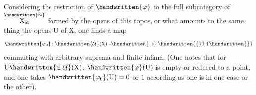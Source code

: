 \clearpage
{}

\newsavebox{\coteFourTypescript}
\begin{lrbox}{\coteFourTypescript}
\begin{minipage}[t]{.96\linewidth}
Considering the restriction of $\handwritten{\varphi}$ to the full subcategory of $\overset{\handwritten{\sim}}{\mathrm{X}_{\text{ét}}}$ formed by the opens of this topos, or what amounts to the same thing  the opens $\mathrm U$ of $\mathrm X$, one finds a map
\[
\handwritten{\varphi_{0}}:\handwritten{\mathcal U}(\mathrm X)\mathrel{\mbox{-}\mkern-2mu\mbox{-}\mkern-3mu\handwritten{\to}}\handwritten{\bigl\{}0,1\handwritten{\bigr\}}
\]
commuting with arbitrary suprema and finite infima. (One notes that for $\mathrm U\handwritten{\in\mathcal U}(\mathrm X)$, $\handwritten{\varphi}(\mathrm U)$ is empty or reduced to a point, and one takes $\handwritten{\varphi_{0}}(\mathrm U)=0$ or $1$ according as one is in one case or the other).


\end{minipage}
\end{lrbox}
